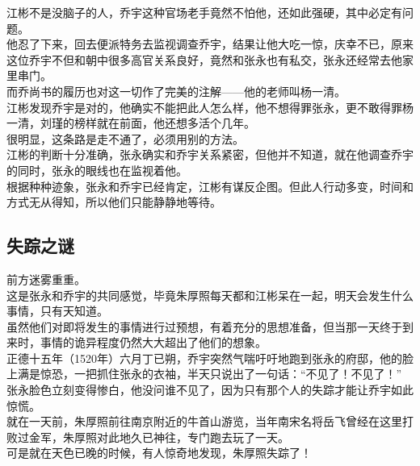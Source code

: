 \begin{multicols}{\theparacolNo}
江彬不是没脑子的人，乔宇这种官场老手竟然不怕他，还如此强硬，其中必定有问题。\\

他忍了下来，回去便派特务去监视调查乔宇，结果让他大吃一惊，庆幸不已，原来这位乔宇不但和朝中很多高官关系良好，竟然和张永也有私交，张永还经常去他家里串门。\\

而乔尚书的履历也对这一切作了完美的注解——他的老师叫杨一清。\\

江彬发现乔宇是对的，他确实不能把此人怎么样，他不想得罪张永，更不敢得罪杨一清，刘瑾的榜样就在前面，他还想多活个几年。\\

很明显，这条路是走不通了，必须用别的方法。\\

江彬的判断十分准确，张永确实和乔宇关系紧密，但他并不知道，就在他调查乔宇的同时，张永的眼线也在监视着他。\\

根据种种迹象，张永和乔宇已经肯定，江彬有谋反企图。但此人行动多变，时间和方式无从得知，所以他们只能静静地等待。\\

\subsection{失踪之谜}
前方迷雾重重。\\

这是张永和乔宇的共同感觉，毕竟朱厚照每天都和江彬呆在一起，明天会发生什么事情，只有天知道。\\

虽然他们对即将发生的事情进行过预想，有着充分的思想准备，但当那一天终于到来时，事情的诡异程度仍然大大超出了他们的想象。\\

正德十五年（1520年）六月丁已朔，乔宇突然气喘吁吁地跑到张永的府邸，他的脸上满是惊恐，一把抓住张永的衣袖，半天只说出了一句话：“不见了！不见了！”\\

张永脸色立刻变得惨白，他没问谁不见了，因为只有那个人的失踪才能让乔宇如此惊慌。\\

就在一天前，朱厚照前往南京附近的牛首山游览，当年南宋名将岳飞曾经在这里打败过金军，朱厚照对此地久已神往，专门跑去玩了一天。\\

可是就在天色已晚的时候，有人惊奇地发现，朱厚照失踪了！\\


\end{multicols}
